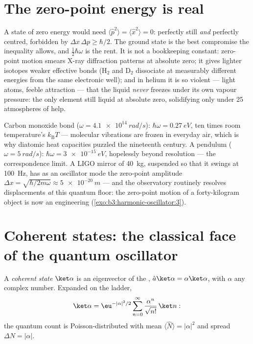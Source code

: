 \section{The zero-point energy is real}

\begin{remark}\label{rem:b3:harmonic-oscillator:zeropoint}
A state of zero energy would need $\langle\hat p^2\rangle =
\langle\hat x^2\rangle = 0$: perfectly still \emph{and} perfectly
centred, forbidden by $\Delta x\,\Delta p \ge \hbar/2$. The ground
state is the best compromise the inequality allows, and
$\tfrac12\hbar\omega$ is the rent. It is not a bookkeeping constant:
zero-point motion smears X-ray diffraction patterns at absolute
zero; it gives lighter isotopes weaker effective bonds (H$_2$ and
D$_2$ dissociate at measurably different energies from the same
electronic well); and in helium it is so violent --- light atoms,
feeble attraction --- that the liquid \emph{never} freezes under its
own vapour pressure: the only element still liquid at absolute
zero, solidifying only under 25 atmospheres of help.
\end{remark}

\begin{example}\label{ex:b3:harmonic-oscillator:scales}
Carbon monoxide bond ($\omega = \qty{4.1e14}{rad/s}$): $\hbar\omega =
\qty{0.27}{eV}$, ten times room temperature's $k_{\text{B}}T$ ---
molecular vibrations are frozen in everyday air, which is why
diatomic heat capacities puzzled the nineteenth century. A pendulum
($\omega = \qty{5}{rad/s}$): $\hbar\omega = \qty{3e-15}{eV}$,
hopelessly beyond resolution --- the correspondence limit. A LIGO
mirror of \qty{40}{kg}, suspended so that it swings at
\qty{100}{Hz}, has as an oscillator mode the zero-point amplitude $\Delta x =
\sqrt{\hbar/2m\omega} \approx \qty{5e-20}{m}$ --- and the observatory
routinely resolves displacements \emph{at} this quantum floor: the
zero-point motion of a forty-kilogram object is now an engineering
 (\cref{exo:b3:harmonic-oscillator:3}).
\end{example}

\section{Coherent states: the classical face of the quantum oscillator}

\begin{definition}\label{def:b3:harmonic-oscillator:coherent}
A \emph{coherent state} $\ket\alpha$ is an eigenvector of the
, $\hat a\ket\alpha = \alpha\ket\alpha$, with
$\alpha$ any complex number. Expanded on the ladder,
\[
\ket\alpha = \eu^{-|\alpha|^2/2}\sum_{n=0}^\infty
\frac{\alpha^n}{\sqrt{n!}}\,\ket n :
\]
the quantum count is Poisson-distributed with mean $\langle\hat
N\rangle = |\alpha|^2$ and spread $\Delta N = |\alpha|$.
\end{definition}

